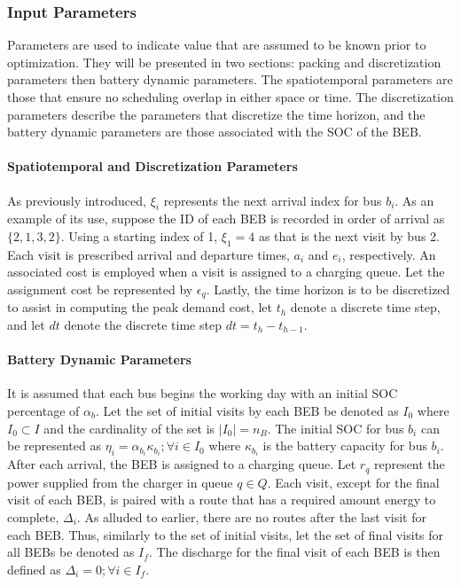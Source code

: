 \documentclass[energies,article,submit,moreauthors]{Definitions/mdpi}
\newcommand{\Iset}{I}                       %
\newcommand{\Isetinit}{I_0}                 %
\newcommand{\Isetfinal}{I_f}                %
\begin{document}
\subsubsection{Input Parameters}
\label{sec:sa-input-variables}
Parameters are used to indicate value that are assumed to be known prior to optimization. They will be presented in two
sections: packing and discretization parameters then battery dynamic parameters. The spatiotemporal parameters are those
that ensure no scheduling overlap in either space or time. The discretization parameters describe the parameters that
discretize the time horizon, and the battery dynamic parameters are those associated with the SOC of the BEB.

\paragraph{Spatiotemporal and Discretization Parameters}
\label{sec:sa-packing-and-discretization-paramaters}
As previously introduced, \(\xi_i\) represents the next arrival index for bus \(b_i\). As an example of its use, suppose the
ID of each BEB is recorded in order of arrival as \(\{ 2,1,3,2 \}\). Using a starting index of 1, \(\xi_1 = 4\) as that is the
next visit by bus 2. Each visit is prescribed arrival and departure times, \(a_i\) and \(e_i\), respectively. An associated
cost is employed when a visit is assigned to a charging queue. Let the assignment cost be represented by \(\epsilon_q\). Lastly,
the time horizon is to be discretized to assist in computing the peak demand cost, let \(t_h\) denote a discrete time
step, and let \(dt\) denote the discrete time step \(dt = t_h - t_{h-1}\).

\paragraph{Battery Dynamic Parameters}
\label{sec:sa-battery-dynamic-parameters}
It is assumed that each bus begins the working day with an initial SOC percentage of \(\alpha_b\). Let the set of initial
visits by each BEB be denoted as \(\Isetinit\) where \(\Isetinit \subset \Iset\) and the cardinality of the set is \(\lvert
\Isetinit \rvert = n_B\). The initial SOC for bus \(b_i\) can be represented as \(\eta_{i} = \alpha_{b_i}\kappa_{b_i}; \forall i \in \Isetinit\)
where \(\kappa_{b_i}\) is the battery capacity for bus \(b_i\). After each arrival, the BEB is assigned to a charging queue. Let
\(r_q\) represent the power supplied from the charger in queue \(q \in Q\). Each visit, except for the final visit of each
BEB, is paired with a route that has a required amount energy to complete, \(\Delta_i\). As alluded to earlier, there are no
routes after the last visit for each BEB. Thus, similarly to the set of initial visits, let the set of final visits for
all BEBs be denoted as \(\Isetfinal\). The discharge for the final visit of each BEB is then defined as \(\Delta_{i} = 0; \forall i \in
\Isetfinal\).
\end{document}
